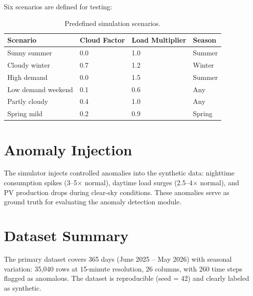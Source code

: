 Six scenarios are defined for testing:

\begin{table}[H]
\centering
\caption{Predefined simulation scenarios.}
\begin{tabular}{llll}
\toprule
\textbf{Scenario} & \textbf{Cloud Factor} & \textbf{Load Multiplier} & \textbf{Season} \\
\midrule
Sunny summer & 0.0 & 1.0 & Summer \\
Cloudy winter & 0.7 & 1.2 & Winter \\
High demand & 0.0 & 1.5 & Summer \\
Low demand weekend & 0.1 & 0.6 & Any \\
Partly cloudy & 0.4 & 1.0 & Any \\
Spring mild & 0.2 & 0.9 & Spring \\
\bottomrule
\end{tabular}
\end{table}

\section{Anomaly Injection}

The simulator injects controlled anomalies into the synthetic data: nighttime consumption spikes (3--5$\times$ normal), daytime load surges (2.5--4$\times$ normal), and PV production drops during clear-sky conditions. These anomalies serve as ground truth for evaluating the anomaly detection module.

\section{Dataset Summary}

The primary dataset covers 365 days (June 2025 -- May 2026) with seasonal variation: 35,040 rows at 15-minute resolution, 26 columns, with 260 time steps flagged as anomalous. The dataset is reproducible (seed = 42) and clearly labeled as synthetic.
